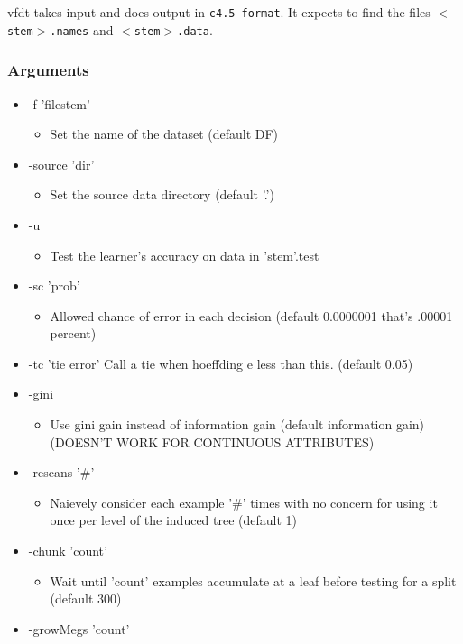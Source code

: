 vfdt takes input and does output in {\tt c4.5 format}. It expects to find the files {\tt $<$stem$>$.names} and {\tt $<$stem$>$.data}.

\subsubsection*{Arguments}

\begin{itemize}
\item -f 'filestem'\begin{itemize}
\item Set the name of the dataset (default DF)\end{itemize}
\item -source 'dir'\begin{itemize}
\item Set the source data directory (default '.')\end{itemize}
\item -u\begin{itemize}
\item Test the learner's accuracy on data in 'stem'.test\end{itemize}
\item -sc 'prob'\begin{itemize}
\item Allowed chance of error in each decision (default 0.0000001 that's .00001 percent)\end{itemize}
\item -tc 'tie error' Call a tie when hoeffding e less than this. (default 0.05)\item -gini\begin{itemize}
\item Use gini gain instead of information gain (default information gain) (DOESN'T WORK FOR CONTINUOUS ATTRIBUTES)\end{itemize}
\item -rescans '\#'\begin{itemize}
\item Naievely consider each example '\#' times with no concern for using it once per level of the induced tree (default 1)\end{itemize}
\item -chunk 'count'\begin{itemize}
\item Wait until 'count' examples accumulate at a leaf before testing for a split (default 300)\end{itemize}
\item -grow\-Megs 'count'\begin{itemize}

\end{itemize}
\end{itemize}
